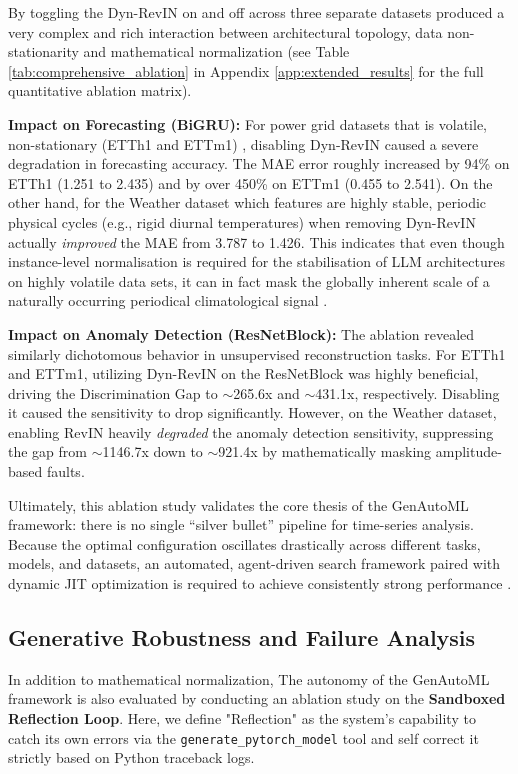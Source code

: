 \documentclass{article}
\begin{document}
By toggling the Dyn-RevIN on and off across three separate datasets produced a very complex and rich interaction between architectural topology, data non-stationarity and mathematical normalization (see Table \ref{tab:comprehensive_ablation} in Appendix \ref{app:extended_results} for the full quantitative ablation matrix).

\textbf{Impact on Forecasting (BiGRU):} For power grid datasets that is  volatile, non-stationary  (ETTh1 and ETTm1) \cite{zhou2021informer}, disabling Dyn-RevIN caused a severe degradation in forecasting accuracy. The MAE error roughly increased by 94\% on ETTh1 (1.251 to 2.435) and by over 450\% on ETTm1 (0.455 to 2.541). On the other hand, for the Weather dataset which features are highly stable, periodic physical cycles (e.g., rigid diurnal temperatures) when removing Dyn-RevIN actually \textit{improved} the MAE from 3.787 to 1.426. This indicates that even though instance-level normalisation is required for the stabilisation of LLM architectures on highly volatile data sets, it can in fact mask the globally inherent scale of a naturally occurring periodical climatological signal \cite{liu2022non}.

\textbf{Impact on Anomaly Detection (ResNetBlock):} The ablation revealed similarly dichotomous behavior in unsupervised reconstruction tasks. For ETTh1 and ETTm1, utilizing Dyn-RevIN on the ResNetBlock was highly beneficial, driving the Discrimination Gap to $\sim$265.6x and $\sim$431.1x, respectively. Disabling it caused the sensitivity to drop significantly. However, on the Weather dataset, enabling RevIN heavily \textit{degraded} the anomaly detection sensitivity, suppressing the gap from $\sim$1146.7x down to $\sim$921.4x by mathematically masking amplitude-based faults.

Ultimately, this ablation study validates the core thesis of the GenAutoML framework: there is no single ``silver bullet'' pipeline for time-series analysis. Because the optimal configuration oscillates drastically across different tasks, models, and datasets, an automated, agent-driven search framework paired with dynamic JIT optimization is required to achieve consistently strong performance \cite{wolpert1997no}.


\subsection{Generative Robustness and Failure Analysis}
In addition to mathematical normalization, The autonomy of the GenAutoML framework is also evaluated by conducting an ablation study on the \textbf{Sandboxed Reflection Loop}. Here, we define "Reflection" as the system’s capability to catch its own errors via the \texttt{generate\_pytorch\_model} tool and self correct it strictly based on Python traceback logs.
\end{document}
